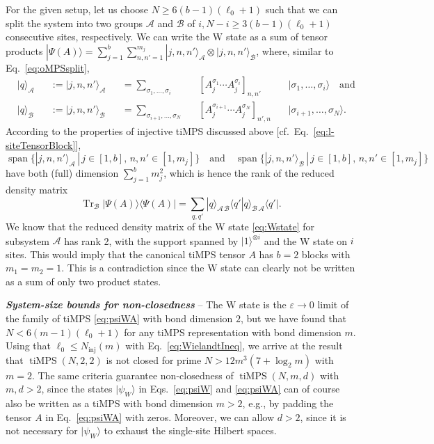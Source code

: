 \documentclass[english,11pt,aps,pra,onecolumn,tightenlines,groupedaddress,superscriptaddress,notitlepage,floatfix,fleqn]{revtex4-1}
\newcommand{\bra}{\langle}
\newcommand{\ket}{\rangle}
\newcommand{\Tr}{\operatorname{Tr}}
\newcommand{\Span}{\operatorname{span}}
\newcommand{\s}{\sigma}
\newcommand{\mc}[1]{\mathcal{#1}}
\newcommand{\A}{\mc{A}}
\newcommand{\B}{\mc{B}}
\newcommand{\inj}{\text{inj}}
\newcommand{\tiMPS}{\operatorname{tiMPS}}
\newcommand{\veps}{\varepsilon}
\newcommand{\Emph}[1]{\textbf{\emph{#1}}}
\begin{document}
For the given setup, let us choose $N\geq 6(b-1)(\ell_0+1)$ such that we can split the system into two groups $\A$ and $\B$ of $i,N-i\geq 3(b-1)(\ell_0+1)$ consecutive sites, respectively. We can write the W state as a sum of tensor products $|\Psi(A)\ket=\sum_{j=1}^b\sum_{n,n'=1}^{m_j}|j,n,n'\ket_\A\otimes|j,n,n'\ket_\B$, where, similar to Eq.~\eqref{eq:oMPSsplit},
\begin{subequations}\label{eq:tiMPSsplit}
\begin{alignat}{7}
	&|q\ket_\A&&:=|j,n,n'\ket_\A&&=\textstyle\sum_{\s_1,\dotsc,\s_i}     &&[A_j^{\s_{1}}    \dotsb A_j^{\s_i}]_{n,n'}\,&&|\s_{1},  \dotsc,\s_i\ket\quad\text{and}\\
	&|q\ket_\B&&:=|j,n,n'\ket_\B&&=\textstyle\sum_{\s_{i+1},\dotsc,\s_N} &&[A_j^{\s_{i+1}}\dotsb A_j^{\s_N}  ]_{n',n}\,&&|\s_{i+1},\dotsc,\s_N\ket.
\end{alignat}
\end{subequations}
According to the properties of injective tiMPS discussed above [cf.\ Eq.~\eqref{eq:l-siteTensorBlock}],
\begin{equation}
	\Span\{|j,n,n'\ket_\A\,|\,j\in[1,b],\,n,n'\in[1,m_j]\}\quad\text{and}\quad
	\Span\{|j,n,n'\ket_\B\,|\,j\in[1,b],\,n,n'\in[1,m_j]\}
\end{equation}
have both (full) dimension $\sum_{j=1}^b m_j^2$, which is hence the rank of the reduced density matrix
\begin{equation}\label{eq:tiMPS-W-rhoA}\textstyle
	\Tr_\B|\Psi(A)\ket\bra\Psi(A)|=\sum_{q,q'}|q\ket_{\A\,\B}\bra q'|q\ket_{\B\,\A}\bra q'|.
\end{equation}
We know that the reduced density matrix of the W state \eqref{eq:Wstate} for subsystem $\A$ has rank 2, with the support spanned by $|1\ket^{\otimes i}$ and the W state on $i$ sites. This would imply that the canonical tiMPS tensor $A$ has $b=2$ blocks with $m_1=m_2=1$. This is a contradiction since the W state can clearly not be written as a sum of only two product states.

\Emph{System-size bounds for non-closedness} --
The W state is the $\veps\to 0$ limit of the family of tiMPS \eqref{eq:psiWA} with bond dimension $2$, but we have found that $N< 6(m-1)(\ell_0+1)$ for any tiMPS representation with bond dimension $m$. Using that $\ell_0\leq N_\inj(m)$ with Eq.~\eqref{eq:WielandtIneq}, we arrive at the result that $\tiMPS(N,2,2)$ is not closed for prime $N> 12 m^3(7+\log_2 m)$ with $m=2$. The same criteria guarantee non-closedness of $\tiMPS(N,m,d)$ with $m,d>2$, since the states $|\psi_W\ket$ in Eqs.~\eqref{eq:psiW} and \eqref{eq:psiWA} can of course also be written as a tiMPS with bond dimension $m>2$, e.g., by padding the tensor $A$ in Eq.~\eqref{eq:psiWA} with zeros. Moreover, we can allow $d>2$, since it is not necessary for $|\psi_W\ket$ to exhaust the single-site Hilbert spaces.
\end{document}
